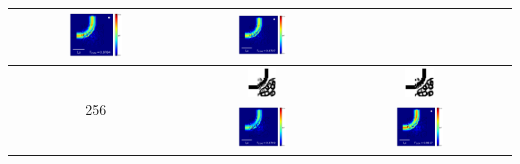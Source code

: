 \begin{table}[ht]
\begin{tabular}{|c|c|c|c|}
      \includegraphics[width=0.33\textwidth]{image/results/bend/PSO/visualize_field_disc_128.png} &
      \includegraphics[width=0.33\textwidth]{image/results/bend/PSO/visualize_field_fab_128.png} \\
    \hline
      \multirow{2}{*}{256} &
      \includegraphics[width=0.20\textwidth]{image/results/bend/PSO/visualize_eps_cont_256.png} &
      \includegraphics[width=0.20\textwidth]{image/results/bend/PSO/visualize_eps_disc_256.png} \\
      \cline{2-4}
      &
      \includegraphics[width=0.33\textwidth]{image/results/bend/PSO/visualize_field_cont_256.png} &
      \includegraphics[width=0.33\textwidth]{image/results/bend/PSO/visualize_field_disc_256.png} \\

\end{tabular}
\end{table}

